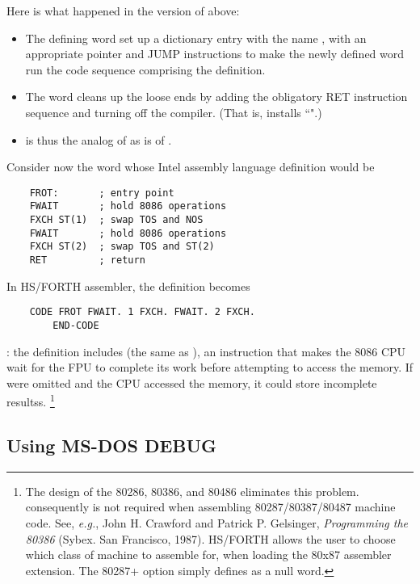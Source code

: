 Here is what happened in the  version of  above:

\begin{itemize}
    \item The defining word  set up a dictionary entry with the name , with an appropriate pointer and JUMP instructions to make the newly defined word run the code sequence comprising the definition.
    \item The word  cleans up the loose ends by adding the obligatory RET instruction sequence and turning off the compiler. (That is,  installs “".)
    \item {} is thus the analog of \bc{;} as  is of \bc{:}.
\end{itemize}

Consider now the word  whose Intel assembly language definition would be

\begin{lstlisting}
    FROT:       ; entry point
    FWAIT       ; hold 8086 operations
    FXCH ST(1)  ; swap TOS and NOS
    FWAIT       ; hold 8086 operations
    FXCH ST(2)  ; swap TOS and ST(2)
    RET         ; return
\end{lstlisting}

In HS/FORTH assembler, the definition becomes

\begin{lstlisting}
    CODE FROT FWAIT. 1 FXCH. FWAIT. 2 FXCH.
        END-CODE
\end{lstlisting}

\leftbar[1\linewidth]
\Note: the definition includes  (the same as ), an instruction that makes the 8086 CPU wait for the FPU to complete its work before attempting to access the memory. If  were omitted and the CPU accessed the memory, it could store incomplete resultss.
\endleftbar \footnote{The design of the 80286, 80386, and 80486 eliminates this problem. consequently  is not required when assembling 80287/80387/80487 machine code. See, \textit{e.g.}, John H. Crawford and Patrick P. Gelsinger, \textit{Programming the 80386} (Sybex. San Francisco, 1987). HS/FORTH allows the user to choose which class of machine to assemble for, when loading the 80x87 assembler extension. The 80287+ option simply defines  as a null word.}

\subsection{Using MS-DOS DEBUG}

